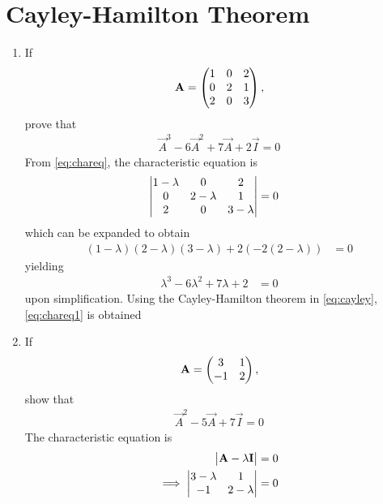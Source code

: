 \documentclass[journal,12pt,twocolumn]{IEEEtran}
\renewcommand\thesection{\arabic{section}}
\begin{document}
\section{Cayley-Hamilton Theorem}
\renewcommand{\theequation}{\theenumi}
\begin{enumerate}[label=\thesection.\arabic*.,ref=\thesection.\theenumi]

\item If 
\begin{align}
\mathbf{A}=\begin{pmatrix} 1 &0 &2\\0 &2 &1\\2 &0 &3\end{pmatrix},
\end{align}
prove that 
\begin{align}
	\label{eq:chareq1}
	\vec{A}^3-6\vec{A}^2+7\vec{A}+2\vec{I}=0
	\end{align}
\solution 
From   \eqref{eq:chareq}, the characteristic equation is 
\begin{align}
%
 \mydet{1 -\lambda & 0 & 2 \\ 0 & 2 -\lambda & 1 \\ 2 & 0 & 3-\lambda} &= 0  
\end{align}
which can be expanded to obtain 
\begin{align}
%
 (1-\lambda)(2-\lambda)(3-\lambda) + 2(-2(2-\lambda)) &= 0
\end{align}
yielding
\begin{align}
%
 \lambda^3 - 6\lambda^2 + 7\lambda + 2 &= 0
\end{align}
%
upon simplification. 
Using  the Cayley-Hamilton theorem in \eqref{eq:cayley}, 	\eqref{eq:chareq1} is obtained
%
%
\item If 
\begin{align}
	\mathbf{A}=\begin{pmatrix} 3 &1\\-1 &2\end{pmatrix},
	\end{align}
	show that 
	\begin{align}
		\label{eq:chareq2}
		\vec{A}^{2}-5\vec{A}+7\vec{I}=0
		\end{align}
\solution
The characteristic equation is 
\begin{align}
\mydet{\vec{A}-\lambda \vec{I}}&=0
\\ \implies \mydet{3-\lambda & 1 \\ -1 & 2-\lambda}&=0

\end{align}
\end{enumerate}
\end{document}

